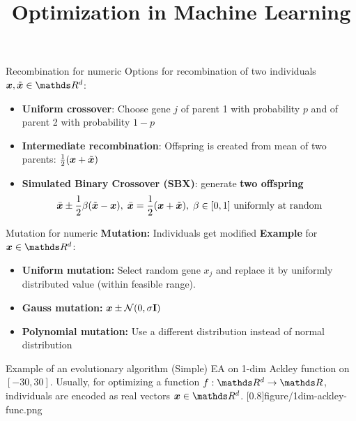 \documentclass[11pt,compress,t,notes=noshow, xcolor=table]{beamer}
\title{Optimization in Machine Learning}
\begin{document}

\begin{framev}{Recombination for numeric}
Options for recombination of two individuals $\xv, \tilde{\xv} \in \R^d$: 
\begin{itemize}
\item \textbf{Uniform crossover}: Choose gene $j$ of parent 1 with probability $p$ and of parent 2 with probability $1-p$
\item \textbf{Intermediate recombination}: Offspring is created from mean of two parents: $\frac{1}{2}(\bm{x} + \tilde{\bm{x}})$
\item \textbf{Simulated Binary Crossover (SBX)}: generate \textbf{two offspring}
$$
\bar{\bm{x}} \pm \frac{1}{2} \beta (\tilde{\bm{x}} - \bm{x}), \; \bar{\bm{x}} = \frac{1}{2} (\bm{x} + \tilde{\bm{x}}), \; \text{$\beta \in [0, 1]$ uniformly at random}
$$
\end{itemize}
\vfill
{}
\end{framev}


\begin{framev}[fs=footnotesize]{Mutation for numeric}
\textbf{Mutation:} Individuals get modified
\medskip
\textbf{Example} for $\xv \in \R^d$:
\begin{itemize}
\item \textbf{Uniform mutation:} Select random gene $x_j$ and replace it by uniformly distributed value (within feasible range).
\item \textbf{Gauss mutation:} $\bm{x} \pm \mathcal{N}(0, \sigma \mathbf{I})$
\item \textbf{Polynomial mutation:} Use a different distribution instead of normal distribution
\end{itemize}
\vfill
{}
\end{framev}


\begin{framev}[align=top, fs=small]{Example of an evolutionary algorithm}
(Simple) EA on 1-dim Ackley function on $[-30, 30]$.
Usually, for optimizing a function $f : \R^d \to \R$, individuals are encoded as real vectors $\xv \in \R^d$.
\imageFixed{2.5cm}{2.5cm}[0.8]{figure/1dim-ackley-func.png}
\end{framev}
\end{document}
